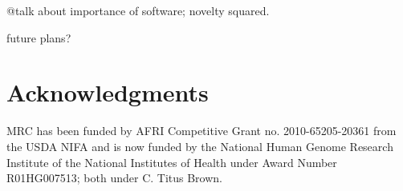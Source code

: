 \documentclass[11pt]{article}
\begin{document}


@talk about importance of software; novelty squared.

future plans?

\section*{Acknowledgments}

MRC has been funded by AFRI Competitive Grant no. 2010-65205-20361
from the USDA NIFA and is now funded by the National Human Genome
Research Institute of the National Institutes of Health under Award
Number R01HG007513; both under C. Titus Brown.








\end{document}
